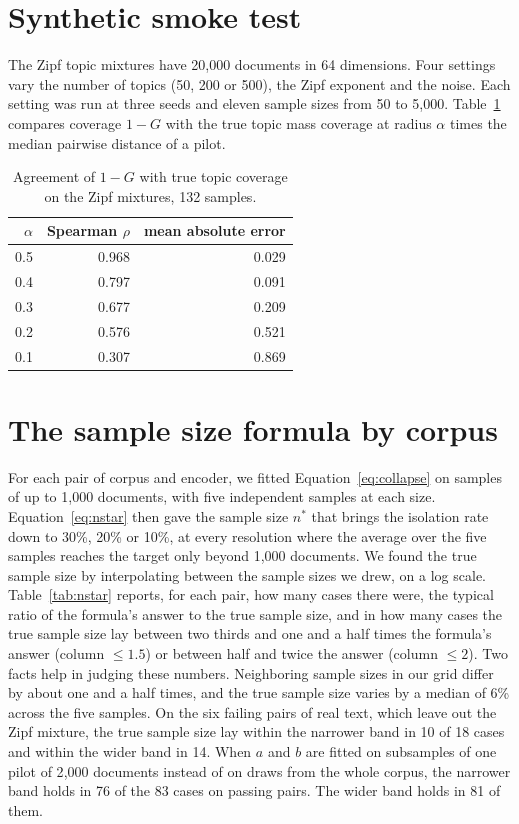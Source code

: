 \section{Synthetic smoke test}
\label{app:smoke}

The Zipf topic mixtures have 20{,}000 documents in 64 dimensions. Four settings vary the number of topics (50, 200 or 500), the Zipf exponent and the noise. Each setting was run at three seeds and eleven sample sizes from 50 to 5{,}000. Table~\ref{tab:smoke} compares coverage $1 - G$ with the true topic mass coverage at radius $\alpha$ times the median pairwise distance of a pilot.

\begin{table}[h]
\centering
\small
\begin{tabular}{rrr}
\toprule
$\alpha$ & Spearman $\rho$ & mean absolute error \\
\midrule
0.5 & 0.968 & 0.029 \\
0.4 & 0.797 & 0.091 \\
0.3 & 0.677 & 0.209 \\
0.2 & 0.576 & 0.521 \\
0.1 & 0.307 & 0.869 \\
\bottomrule
\end{tabular}
\caption{Agreement of $1 - G$ with true topic coverage on the Zipf mixtures, 132 samples.}
\label{tab:smoke}
\end{table}

\section{The sample size formula by corpus}
\label{app:nstar}

For each pair of corpus and encoder, we fitted Equation~\ref{eq:collapse} on samples of up to 1{,}000 documents, with five independent samples at each size. Equation~\ref{eq:nstar} then gave the sample size $n^{*}$ that brings the isolation rate down to 30\%, 20\% or 10\%, at every resolution where the average over the five samples reaches the target only beyond 1{,}000 documents. We found the true sample size by interpolating between the sample sizes we drew, on a log scale. Table~\ref{tab:nstar} reports, for each pair, how many cases there were, the typical ratio of the formula's answer to the true sample size, and in how many cases the true sample size lay between two thirds and one and a half times the formula's answer (column $\le 1.5$) or between half and twice the answer (column $\le 2$). Two facts help in judging these numbers. Neighboring sample sizes in our grid differ by about one and a half times, and the true sample size varies by a median of 6\% across the five samples. On the six failing pairs of real text, which leave out the Zipf mixture, the true sample size lay within the narrower band in 10 of 18 cases and within the wider band in 14. When $a$ and $b$ are fitted on subsamples of one pilot of 2{,}000 documents instead of on draws from the whole corpus, the narrower band holds in 76 of the 83 cases on passing pairs. The wider band holds in 81 of them.

